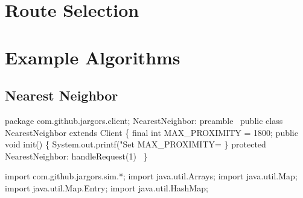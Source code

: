 
\nwenddocs{}\chapter{Route Selection}
\label{search-routes}

\nwenddocs{}\chapter{Example Algorithms}
\label{search-algorithms}

\section{Nearest Neighbor}

\nwenddocs{}\endmoddef\nwstartdeflinemarkup\nwenddeflinemarkup
package com.github.jargors.client;
\LA{}NearestNeighbor: preamble~{\nwtagstyle{}}\RA{}
public class NearestNeighbor extends Client \{
  final int MAX_PROXIMITY = 1800;
  public void init() \{
    System.out.printf("Set MAX_PROXIMITY=%
  \}
  protected \LA{}NearestNeighbor: handleRequest(1)~{\nwtagstyle{}}\RA{}
\}
\nwendcode{}\nwdocspar

\nwenddocs{}\endmoddef\nwstartdeflinemarkup{}\nwenddeflinemarkup
import com.github.jargors.sim.*;
import java.util.Arrays;
import java.util.Map;
import java.util.Map.Entry;
import java.util.HashMap;
\nwendcode{}\nwdocspar

